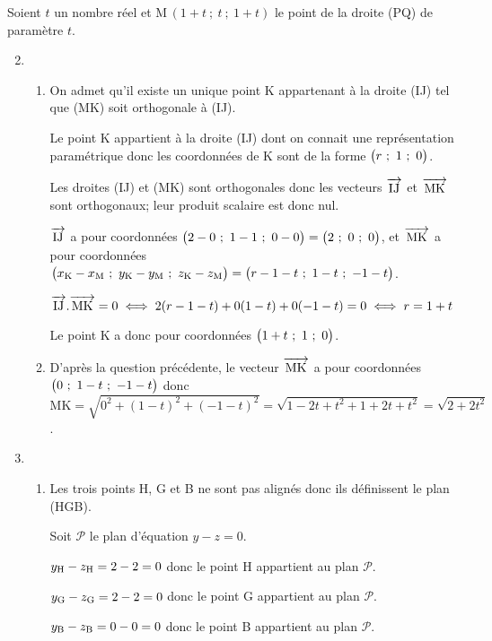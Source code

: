 \documentclass[10pt,a4paper]{article}
\newcommand{\vectt}[1]{\overrightarrow{\,\mathstrut\text{#1}\,}}%
\newcommand{\ds}{\displaystyle}
\begin{document}
Soient $t$ un nombre réel et M\,$(1+t~;~t~;~1+t)$ le point de la droite (PQ) de paramètre $t$.

\begin{enumerate}
\setcounter{enumi}{1}
\item 
\begin{enumerate}
\item On admet qu'il existe un unique point K appartenant à la droite (IJ) tel que (MK) soit orthogonale à (IJ).


Le point K appartient à la droite (IJ) dont on connait une représentation paramétrique donc les coordonnées de K sont de la forme $\left( r~;~1~;~0\strut\right )$.

Les droites (IJ) et (MK) sont orthogonales donc les vecteurs $\vectt{IJ}$ et $\vectt{MK}$ sont orthogonaux; leur produit scalaire est donc nul.

$\vectt{IJ}$ a pour coordonnées $\left( 2-0~;~1-1~;~0-0\strut\right ) = \left( 2~;~0~;~0\strut\right )$, et $\vectt{MK}$ a pour coordonnées $\left( x_{\text K} - x_{\text M} ~;~y_{\text K} - y_{\text M}~;~z_{\text K} - z_{\text M}\strut\right )=\left( r-1-t~;~1-t~;~-1-t\strut\right )$.

$\vectt{IJ}.\vectt{MK}=0
\iff
2(r-1-t)+0(1-t) + 0(-1-t) = 0 \iff r=1+t$

Le point K a donc pour coordonnées $\left( 1+t~;~1~;~0\strut\right )$.

\item%
D'après la question précédente, le vecteur $\vectt{MK}$ a pour coordonnées 
$\left( 0~;~1-t~;~-1-t\strut\right )$ donc
$\text{MK} = \ds\sqrt{0^2 + (1-t)^2+ (-1-t)^2}
= \ds\sqrt{1-2t+t^2+1+2t+t^2} = \ds\sqrt{2+2t^2}$.

\end{enumerate}

\item
\begin{enumerate}
\item Les trois points H, G et B ne sont pas alignés donc ils définissent le plan (HGB).

Soit $\mathcal{P}$ le plan d'équation $y-z=0$.

$y_{\text H} -z_{\text H} = 2-2=0$ donc le point H appartient au plan $\mathcal{P}$.

$y_{\text G} -z_{\text G} = 2-2=0$ donc le point G appartient au plan $\mathcal{P}$.

$y_{\text B} -z_{\text B} = 0-0=0$ donc le point B appartient au plan $\mathcal{P}$.


\end{enumerate}
\end{enumerate}
\end{document}
